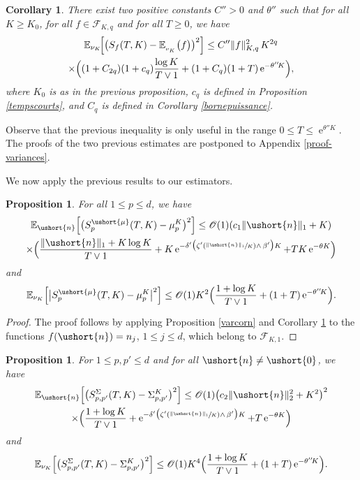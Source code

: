\documentclass[11pt]{article}
\newcommand{\Psfrac}[2]{(\sfrac{#1}{#2})}
\newcommand{\scaleto}[2]{#1}
\let\mathcal\mathscr
\numberwithin{equation}{section}
\theoremstyle{plain}
\newtheorem{proposition}[theorem]{Proposition}
\newtheorem{corollary}[theorem]{Corollary}
\theoremstyle{definition}
\newcommand{\E}{{\mathbb{E}}}
\newcommand{\Oun}{\mathcal{O}(1)}
\newcommand{\sK}{K}
\newcommand{\vecn}{\ushort{n}}
\newcommand{\vmu}{\ushort{\mu}}
\newcommand{\veczer}{\ushort{0}}
\newcommand{\e}{\operatorname{e}}
\newcommand{\norm}[1]{\|#1\|_{1}}\let\snorm\norm
\newcommand{\normdeux}[1]{\|#1\|_{2}}\let\snormdeux\normdeux
\begin{document}
\begin{corollary}\label{varcornu}
There exist two positive constants $C''>0$ and $\theta''$ such that
for all $K\geq K_0$, for all $f\in\mathscr{F}\!_{\sK,q}$ and for all $T\geq 0$, we have
\begin{multline*}
\E_{\snuk}\!\Bigl[\bigl(S_{f}(T,K)-\E_{_{\snuk}}\bigl(f\bigr)\bigr)^2\Bigr]\leq C'' \|f\|_{\sK,q}^2\, K^{2q}\\
\times \Bigl((1+C_{2q})(1+c_q)\frac{\log K}{T\vee 1}+ (1+C_q)(1+T) \e^{-\theta'' \! K} \Bigr),
\end{multline*}
where $K_0$ is as in the previous proposition, $c_q$ is defined in Proposition \ref{tempscourts}, and $C_q$ is defined in
Corollary \ref{bornepuissance}.
\end{corollary}
Observe that the previous inequality is only useful in the range $0\leq T \le \e^{\theta'' \! K}$.
The proofs of the two previous estimates are postponed to Appendix \ref{proof-variances}.

We now apply the previous results to our estimators.

\begin{proposition}
For all $1\leq p\leq d$, we have
\begin{multline*}
\E_{\vecn}\Bigl[\bigl(S^{\vmu}_p(T,K)-\mu_p^{\sK}\bigr)^2\Bigr]\le \Oun(c_1\norm{\vecn} +K)\\
\times
\Bigl(\frac{\norm{\vecn} +K \log K}{T\vee 1}+ K\e^{-\delta'\bigl(\zeta' \Psfrac{\|\vecn\|_{1}}{K}\wedge\, \beta'\bigr)K} + T K\e^{-\theta K} \Bigr)
\end{multline*}
and
\[
\E_{\snuk}\Bigl[\big|S^{\vmu}_p(T,K)-\mu_p^{\sK}\big|^2\Bigr]\le
\Oun K^2 \Bigl(\frac{1+\log K}{T\vee 1}+(1+T) \e^{-\theta''\! K} \Bigr).
\]
\end{proposition}

\begin{proof}
The proof follows by applying Proposition \ref{varcorn} and Corollary \ref{varcornu} to the functions $f(\vecn)=n_j$, $1\leq j\leq d$, which belong to $\mathscr{F}\!_{\sK,\scaleto{1}{4pt}}$.
\end{proof}

\begin{proposition}
\label{vs2}
For $1\leq p,p'\leq d$ and for all $\vecn\neq \veczer$, we have
\begin{multline*}
\E_{\vecn}\Bigl[\bigl(S^{{ \Sigma}}_{p,p'}(T,K)-\Sigma_{p,p'}^{\sK}\bigr)^2\Bigr]\le
\Oun \bigl(c_{2}\normdeux{\vecn}^{\scaleto{2}{3.5pt}} +K^2\bigr)^2\\ \times
\Bigl(
\frac{1+\log K}{T\vee 1}+ \e^{-\delta'\bigl(\zeta' \Psfrac{\|\vecn\|_{1}}{K}\wedge\, \beta'\bigr)K} + T \e^{-\theta K}
\Bigr)
\end{multline*}
and
\[
\E_{\snuk}\!\left[\bigl(S^{{ \Sigma}}_{p,p'}(T,K)-\Sigma_{p,p'}^{\sK}\bigr)^2\right]
\le \Oun K^{\scaleto{4}{4pt}} \Bigl(\frac{1+\log K}{T\vee 1}+(1+T) \e^{-\theta'' \!K} \Bigr).
\]
\end{proposition}
\end{document}
